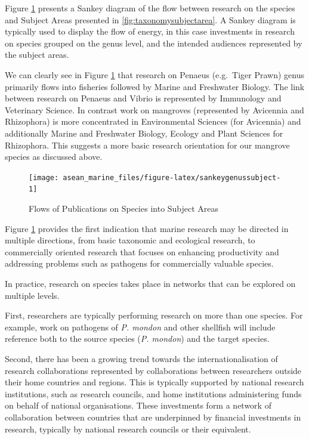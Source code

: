 \documentclass[openany]{book}
\theoremstyle{definition}
\theoremstyle{definition}
\theoremstyle{definition}
\theoremstyle{remark}
\begin{document}
Figure \ref{fig:sankeygenussubject} presents a Sankey diagram of the
flow between research on the species and Subject Areas presented in
\ref{fig:taxonomysubjectarea}. A Sankey diagram is typically used to
display the flow of energy, in this case investments in research on
species grouped on the genus level, and the intended audiences
represented by the subject areas.

We can clearly see in Figure \ref{fig:sankeygenussubject} that research
on Penaeus (e.g.~Tiger Prawn) genus primarily flows into fisheries
followed by Marine and Freshwater Biology. The link between research on
Penaeus and Vibrio is represented by Immunology and Veterinary Science.
In contrast work on mangroves (represented by Avicennia and Rhizophora)
is more concentrated in Environmental Sciences (for Avicennia) and
additionally Marine and Freshwater Biology, Ecology and Plant Sciences
for Rhizophora. This suggests a more basic research orientation for our
mangrove species as discussed above.

\begin{figure}

{\centering \texttt{[image: asean\_marine\_files/figure-latex/sankeygenussubject-1]} 

}

\caption{Flows of Publications on Species into Subject Areas}\label{fig:sankeygenussubject}
\end{figure}

Figure \ref{fig:sankeygenussubject} provides the first indication that
marine research may be directed in multiple directions, from basic
taxonomic and ecological research, to commercially oriented research
that focuses on enhancing productivity and addressing problems such as
pathogens for commercially valuable species.

In practice, research on species takes place in networks that can be
explored on multiple levels.

First, researchers are typically performing research on more than one
species. For example, work on pathogens of \emph{P. mondon} and other
shellfish will include reference both to the source species (\emph{P.
mondon}) and the target species.

Second, there has been a growing trend towards the internationalisation
of research collaborations represented by collaborations between
researchers outside their home countries and regions. This is typically
supported by national research institutions, such as research councils,
and home institutions administering funds on behalf of national
organisations. These investments form a network of collaboration between
countries that are underpinned by financial investments in research,
typically by national research councils or their equivalent.
\end{document}
